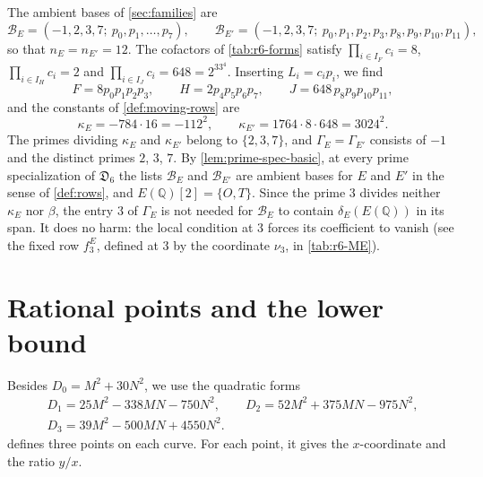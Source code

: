 \documentclass[12pt,oneside,openany]{book}
\theoremstyle{definition}
\theoremstyle{plain}
\numberwithin{equation}{chapter}
\theoremstyle{plain}
\theoremstyle{definition}
\theoremstyle{remark}
\newcommand{\Q}{\mathbb Q}
\newcommand{\datum}{\mathfrak D}
\newcommand{\cB}{\mathcal B}
\begin{document}
The ambient bases of \cref{sec:families} are
\begin{equation}\label{r6:bases}
\cB_E=(-1,2,3,7;\ p_0,p_1,\dots,p_7),\qquad \cB_{E'}=(-1,2,3,7;\ p_0,p_1,p_2,p_3,p_8,p_9,p_{10},p_{11}),
\end{equation}
so that $n_E=n_{E'}=12$. The cofactors of \cref{tab:r6-forms} satisfy $\prod_{i\in I_F}c_i=8$, $\prod_{i\in I_H}c_i=2$ and $\prod_{i\in I_J}c_i=648=2^33^4$. Inserting $L_i=c_ip_i$, we find
\begin{equation}\label{r6:FHJ-p}
F=8p_0p_1p_2p_3,\qquad H=2p_4p_5p_6p_7,\qquad J=648\,p_8p_9p_{10}p_{11},
\end{equation}
and the constants of \cref{def:moving-rows} are
\begin{equation}\label{r6:kappa}
\kappa_E=-784\cdot16=-112^2,\qquad \kappa_{E'}=1764\cdot8\cdot648=3024^2.
\end{equation}
The primes dividing $\kappa_E$ and $\kappa_{E'}$ belong to $\{2,3,7\}$, and $\Gamma_E=\Gamma_{E'}$ consists of $-1$ and the distinct primes $2$, $3$, $7$. By \cref{lem:prime-spec-basic}, at every prime specialization of $\datum_6$ the lists $\cB_E$ and $\cB_{E'}$ are ambient bases for $E$ and $E'$ in the sense of \cref{def:rows}, and $E(\Q)[2]=\{O,T\}$. Since the prime $3$ divides neither $\kappa_E$ nor $\beta$, the entry $3$ of $\Gamma_E$ is not needed for $\cB_E$ to contain $\delta_E(E(\Q))$ in its span. It does no harm: the local condition at $3$ forces its coefficient to vanish (see the fixed row $f^E_3$, defined at $3$ by the coordinate $\nu_3$, in \cref{tab:r6-ME}).

\section{Rational points and the lower bound}\label{sec:r6-points}

Besides $D_0=M^2+30N^2$, we use the quadratic forms
\begin{equation}\label{r6:D}
\begin{gathered}
D_1=25M^2-338MN-750N^2,\qquad D_2=52M^2+375MN-975N^2,\\
D_3=39M^2-500MN+4550N^2.
\end{gathered}
\end{equation}
 defines three points on each curve. For each point, it gives the $x$-coordinate and the ratio $y/x$.
\end{document}
